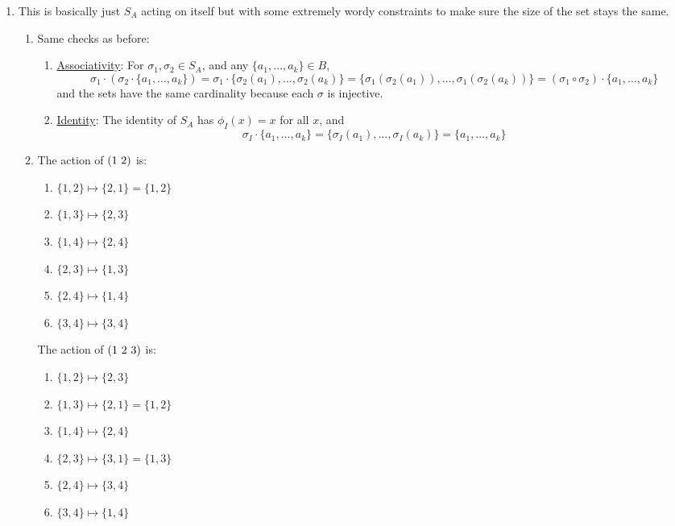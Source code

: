 \documentclass[]{article}
\newcommand*{\cycle}[1]{( \foreach \entry [count=\i] in {#1} {\ifnum\i>1\ \fi\entry})}
\begin{document}
\begin{enumerate}
\item This is basically just $S_A$ acting on itself but with some extremely wordy constraints to make sure the size of the set stays the same.
\begin{enumerate}
\item Same checks as before:
\begin{enumerate}
\item \underline{Associativity}: For $\sigma_1, \sigma_2 \in S_A$, and any $\{a_1,\ldots,a_k\} \in B$, 
\begin{equation}
\sigma_1\cdot (\sigma_2 \cdot \{a_1,\ldots,a_k\}) = \sigma_1\cdot \{\sigma_2(a_1),\ldots,\sigma_2(a_k)\} = \{\sigma_1(\sigma_2(a_1)),\ldots,\sigma_1(\sigma_2(a_k))\} = (\sigma_1\circ \sigma_2) \cdot \{a_1,\ldots,a_k\}
\end{equation}
and the sets have the same cardinality because each $\sigma$ is injective.
\item \underline{Identity}: The identity of $S_A$ has $\phi_I(x) = x$ for all $x$, and 
\begin{equation}
\sigma_I \cdot \{a_1,\ldots,a_k\} = \{\sigma_I(a_1),\ldots,\sigma_I(a_k)\} = \{a_1,\ldots,a_k\}
\end{equation}
\end{enumerate}
\item The action of $\cycle{1,2}$ is:
\begin{enumerate}
\item $\{1,2\} \mapsto \{2,1\} = \{1,2\}$
\item $\{1,3\} \mapsto \{2,3\}$
\item $\{1,4\} \mapsto \{2,4\}$
\item $\{2,3\} \mapsto \{1,3\}$
\item $\{2,4\} \mapsto \{1,4\}$
\item $\{3,4\} \mapsto \{3,4\}$
\end{enumerate}
The action of $\cycle{1,2,3}$ is:
\begin{enumerate}
\item $\{1,2\} \mapsto \{2,3\}$
\item $\{1,3\} \mapsto \{2,1\} = \{1,2\}$
\item $\{1,4\} \mapsto \{2,4\}$
\item $\{2,3\} \mapsto \{3,1\} = \{1,3\}$
\item $\{2,4\} \mapsto \{3,4\}$
\item $\{3,4\} \mapsto \{1,4\}$
\end{enumerate}
\end{enumerate}



\end{enumerate}
\end{document}
